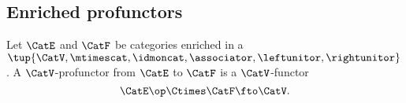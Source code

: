 \subsection{Enriched profunctors}
\begin{ctdefinition}
    \label{def:enriched_profunctor}
    Let $\CatE$ and $\CatF$ be categories enriched in a ~$\tup{\CatV, \mtimescat, \idmoncat, \associator, \leftunitor, \rightunitor}$.
    A $\CatV$-profunctor from $\CatE$ to $\CatF$ is a $\CatV$-functor
    \begin{equation}
        \CatE\op \Ctimes \CatF \fto \CatV.
    \end{equation}
\end{ctdefinition}




